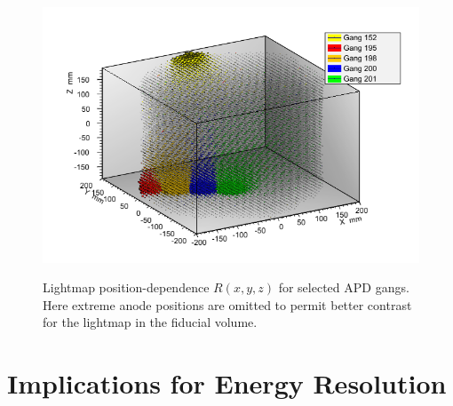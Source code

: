 \begin{figure}
\begin{center}
\includegraphics[keepaspectratio=true,width=\textwidth]{Lightmap_viz_zoom.png}
\end{center}
\renewcommand{\baselinestretch}{1}
\small\normalsize
\begin{quote}
\caption{Lightmap position-dependence $R(x,y,z)$ for selected APD gangs.  Here extreme anode positions are omitted to permit better contrast for the lightmap in the fiducial volume.}
\label{fig1.2}
\end{quote}
\end{figure}
\renewcommand{\baselinestretch}{2}
\small\normalsize

\section{Implications for Energy Resolution}











